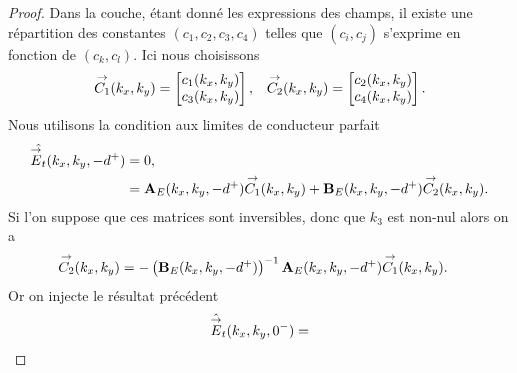         \begin{proof}

          Dans la couche, étant donné les expressions des champs, il existe une répartition des constantes \((c_1,c_2,c_3,c_4)\) telles que \((c_i,c_j)\) s'exprime en fonction de \((c_k,c_l)\).
          Ici nous choisissons
          \begin{align*}
            {\overset{\rightarrow}{C_1}}(k_x,k_y) = \begin{bmatrix}c_1(k_x,k_y) \\ c_3(k_x,k_y)\end{bmatrix}, 
            && 
            {\overset{\rightarrow}{C_2}}(k_x,k_y) = \begin{bmatrix}c_2(k_x,k_y) \\ c_4(k_x,k_y)\end{bmatrix}.
          \end{align*}
          Nous utilisons la condition aux limites de conducteur parfait
          \begin{align*}
            \hat{{\overset{\rightarrow}{E}}_t}(k_x,k_y,-d^+) &= 0,
            \\
            &=  \mathbf{A}_E(k_x,k_y,-d^+){\overset{\rightarrow}{C_1}}(k_x,k_y) + \mathbf{B}_E(k_x,k_y,-d^+){\overset{\rightarrow}{C_2}}(k_x,k_y).
          \end{align*}
          Si l’on suppose que ces matrices sont inversibles, donc que \(k_3\) est non-nul alors on a
          \begin{align*}
            {\overset{\rightarrow}{C_2}}(k_x,k_y) &= -\left(\mathbf{B}_E(k_x,k_y,-d^+)\right)^{-1}\mathbf{A}_E(k_x,k_y,-d^+){\overset{\rightarrow}{C_1}}(k_x,k_y).
          \end{align*}
          Or on injecte le résultat précédent
          \begin{multline*}
            \hat \vE_t(k_x,k_y,0^-) =

\end{multline*}
\end{proof}
